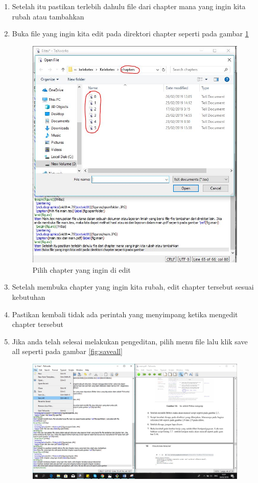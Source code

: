 \begin{enumerate}
\item Setelah itu pastikan terlebih dahulu file dari chapter mana yang ingin kita rubah atau tambahkan
\item Buka file yang ingin kita edit pada direktori chapter seperti pada gambar \ref{fig:chapter}
\begin{figure}[!htbp]
  \centering
  \includegraphics[width=.75\textwidth]{figures/chapter.JPG}
  \caption{Pilih chapter yang ingin di edit}\label{fig:chapter}
\end{figure}
\item Setelah membuka chapter yang ingin kita rubah, edit chapter tersebut sesuai kebutuhan
\item Pastikan kembali tidak ada perintah yang menyimpang ketika mengedit chapter tersebut 
\item Jika anda telah selesai melakukan pengeditan, pilih menu file lalu klik save all seperti pada gambar \ref{fig:saveall}
\begin{figure}[!htbp]
  \centering
  \includegraphics[width=.75\textwidth]{figures/saveall.JPG}

\end{figure}
\end{enumerate}
